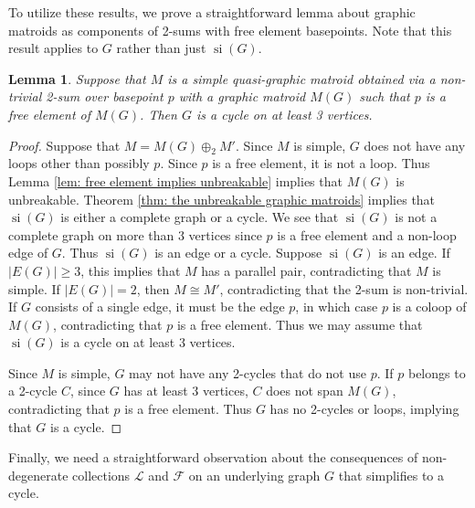 \documentclass[12pt]{article}
\newtheorem{lemma}[theorem]{Lemma}
\theoremstyle{definition}
\theoremstyle{plain} %
\newcommand{\cF}{\mathcal{F}}
\newcommand{\cL}{\mathcal{L}}
\DeclareMathOperator{\si}{si}
\begin{document}
To utilize these results, we prove a straightforward lemma about graphic matroids as components of 2-sums with free element basepoints. Note that this result applies to $G$ rather than just $\si(G)$.   
\begin{lemma}\label{lem: link-sum graphic matroids are cycles}
    Suppose that $M$ is a simple quasi-graphic matroid obtained via a non-trivial 2-sum over basepoint $p$ with a graphic matroid $M(G)$ such that $p$ is a free element of $M(G)$. Then $G$ is a cycle on at least 3 vertices. 
\end{lemma}
\begin{proof}
    Suppose that $M=M(G)\oplus_2M'$. Since $M$ is simple, $G$ does not have any loops other than possibly $p$. Since $p$ is a free element, it is not a loop. Thus Lemma \ref{lem: free element implies unbreakable} implies that $M(G)$ is unbreakable. Theorem \ref{thm: the unbreakable graphic matroids} implies that $\si(G)$ is either a complete graph or a cycle. We see that $\si(G)$ is not a complete graph on more than 3 vertices since $p$ is a free element and a non-loop edge of $G$. Thus $\si(G)$ is an edge or a cycle. Suppose $\si(G)$ is an edge. If $\lvert E(G)\rvert\geq3$, this implies that $M$ has a parallel pair, contradicting that $M$ is simple. If $\lvert E(G)\rvert=2$, then $M\cong M'$, contradicting that the 2-sum is non-trivial. If $G$ consists of a single edge, it must be the edge $p$, in which case $p$ is a coloop of $M(G)$, contradicting that $p$ is a free element. Thus we may assume that $\si(G)$ is a cycle on at least 3 vertices.

    Since $M$ is simple, $G$ may not have any 2-cycles that do not use $p$. If $p$ belongs to a 2-cycle $C$, since $G$ has at least 3 vertices, $C$ does not span $M(G)$, contradicting that $p$ is a free element. Thus $G$ has no 2-cycles or loops, implying that $G$ is a cycle.
\end{proof}


Finally, we need a straightforward observation about the consequences of non-degenerate collections $\cL$ and $\cF$ on an underlying graph $G$ that simplifies to a cycle.
\end{document}
